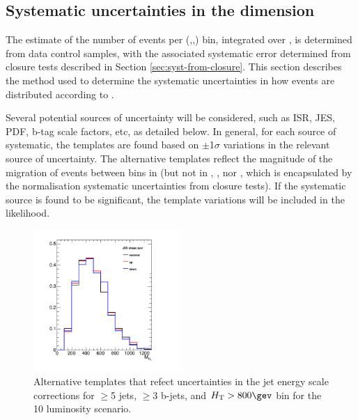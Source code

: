 
\subsection{Systematic uncertainties in the \mht dimension\label{sec:syst-on-shape}}

The estimate of the number of events per (\njet,\nb,\scalht) bin,
integrated over \mht, is determined from data control samples, with
the associated systematic error determined from closure tests
described in Section \ref{sec:syst-from-closure}. This section
describes the method used to determine the systematic uncertainties in
how events are distributed according to \mht. 

Several potential sources of uncertainty will be considered, such as
ISR, JES, PDF, b-tag scale factors, etc, as detailed below. In
general, for each source of systematic, the \mht templates are found
based on $\pm$1$\sigma$ variations in the relevant source of
uncertainty. The alternative templates reflect the magnitude of the
migration of events between bins in \mht (but not in \njet, \nb, nor
\scalht, which is encapsulated by the normalisation systematic
uncertainties from closure tests). If the systematic source is found
to be significant, the template variations will be included in the
likelihood. 

\begin{figure}[]
  \centering
  \includegraphics[width=0.5\textwidth]{figures/closureTests/mhtJetSyst_SMS_T1bbbb_2J_mGl1000_mLSP900_JEC_ge3b_ge5j_800_1600.png}
  \caption{\label{fig:jec-shape} Alternative \mht templates that
    refect uncertainties in the jet energy scale corrections for
    $\geq$5 jets, $\geq$3 b-jets, and $\scalht > 800\gev$ bin for the
    10 \ifb luminosity scenario.}
\end{figure}

